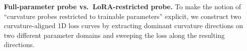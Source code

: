 \documentclass{article}
\theoremstyle{plain}
\theoremstyle{definition}
\theoremstyle{remark}
\begin{document}
\noindent\textbf{Full-parameter probe vs.\ LoRA-restricted probe.}
To make the notion of ``curvature probes restricted to trainable parameters'' explicit, we construct two curvature-aligned 1D loss curves by extracting dominant curvature directions on two different parameter domains and sweeping the loss along the resulting directions.

\begin{itemize}


\end{itemize}
\end{document}
